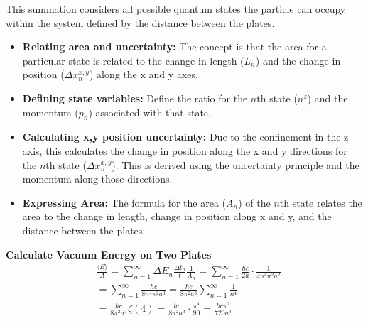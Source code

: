 This summation considers all possible quantum states the particle can occupy within the system 
defined by the distance between the plates.
\begin{itemize}
    \item \textbf{Relating area and uncertainty:} The concept is that the area for a particular state is related to 
    the change in length ($L_n$) and the change in position ($\Delta x_n^{x,y}$) along the x and y axes.
    \item \textbf{Defining state variables:} Define the ratio for the $n$th state ($n^z$) 
    and the momentum ($p_n$) associated with that state.
    \item \textbf{Calculating x,y position uncertainty:} Due to the confinement in the z-axis, 
    this calculates the change in position along the x and y directions for the $n$th state ($\Delta x_n^{x,y}$). 
    This is derived using the uncertainty principle and the momentum along those directions.
    \item \textbf{Expressing Area:} The formula for the area ($A_n$) of the $n$th state relates the area to the change in length, 
    change in position along x and y, and the distance between the plates.
    \end{itemize}
\noindent\textbf{Calculate Vacuum Energy on Two Plates}
\begin{align}
    &\frac{\langle E \rangle}{A} = \sum_{n=1}^{\infty}\Delta E_n\frac{\Delta t_n}{t}\frac{1}{A_n} = \sum_{n=1}^{\infty} \frac{\hbar c }{2 a} \cdot \frac{1}{4 n^4 \pi^2 a^2} \nonumber \\
    &= \sum_{n=1}^{\infty} \frac{\hbar c}{8 n^4 \pi^2 a^3} = \frac{\hbar c}{8 \pi^2 a^3} \sum_{n=1}^{\infty} \frac{1}{n^4} \nonumber \\
    &= \frac{\hbar c}{8 \pi^2 a^3} \zeta(4) = \frac{\hbar c}{8 \pi^2 a^3} \cdot \frac{\pi^4}{90} = \frac{\hbar c \pi^2}{720 a^3}
\end{align}
